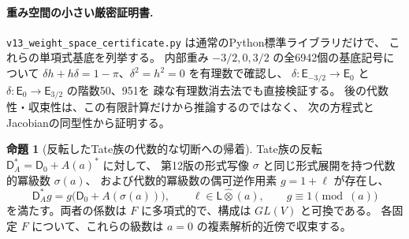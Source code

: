\documentclass[a4paper,11pt]{ltjsarticle}
\theoremstyle{definition}
\newtheorem{proposition}[theorem]{命題}
\begin{document}
\paragraph{重み空間の小さい厳密証明書.}
\texttt{v13\_weight\_space\_certificate.py} は通常のPython標準ライブラリだけで、
これらの単項式基底を列挙する。
内部重み $-3/2,0,3/2$ の全6942個の基底記号について
$\delta h+h\delta=1-\pi$、$\delta^2=h^2=0$ を有理数で確認し、
$\delta:\mathsf E_{-3/2}\to\mathsf E_0$ と
$\delta:\mathsf E_0\to\mathsf E_{3/2}$ の階数50、951を
疎な有理数消去法でも直接検証する。
後の代数性・収束性は、この有限計算だけから推論するのではなく、
次の方程式とJacobianの同型性から証明する。

\begin{proposition}[反転したTate族の代数的な切断への帰着]
\label{prop:v13-algebraic-marked-regauging}
Tate族の反転 $\mathsf D_A^*=\mathsf D_0+A(a)^*$ に対して、
第12版の形式写像 $\sigma$ と同じ形式展開を持つ代数的冪級数 $\sigma(a)$、
および代数的冪級数の偶可逆作用素 $g=1+\ell$ が存在し、
\begin{equation}\label{eq:v13-algebraic-intertwining}
 \mathsf D_A^*g=g\bigl(\mathsf D_0+A(\sigma(a))\bigr),
 \qquad \ell\in\mathsf L\widehat\otimes(a),
 \qquad g\equiv1\pmod{(a)}
\end{equation}
を満たす。両者の係数は $F$ に多項式的で、構成は $GL(V)$ と可換である。
各固定 $F$ について、これらの級数は $a=0$ の複素解析的近傍で収束する。
\end{proposition}
\end{document}
